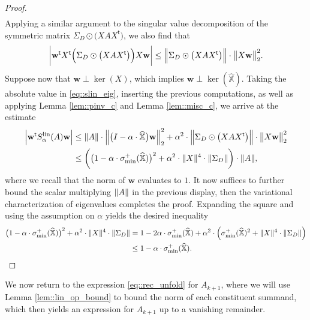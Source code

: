 \documentclass{article}
\newcommand*{\bbX}{\mathbb{X}}
\newcommand*{\bfw}{\mathbf{w}}
\newcommand*{\tran}{^{\mathsf{t}}}
\newcommand*{\sigminp}{\sigma_{\mathrm{min}}^+}
\DeclarePairedDelimiter{\abs}{\lvert}{\rvert}
\DeclarePairedDelimiter{\norm}{\lVert}{\rVert}
\newcommand{\whbbX}{\widehat{\bbX}}
\newcommand{\Slin}{S^{\mathrm{lin}}}
\begin{document}
\begin{proof}
\begin{align*}
  \end{align*} Applying a similar argument to the singular value decomposition
  of the symmetric matrix $\Sigma_D \odot \big(X A X\tran\big)$, we also find
  that \begin{align*}
    \abs[\bigg]{\bfw\tran X\tran \Big(\Sigma_D \odot \big(X A X\tran\big)\Big) X
    \bfw} \leq \norm[\Big]{\Sigma_D \odot \big(X A X\tran\big)} \cdot
    \norm[\big]{X \bfw}_2^2.
  \end{align*} Suppose now that $\bfw \perp \ker(X)$, which implies $\bfw \perp
  \ker(\whbbX)$. Taking the absolute value in \eqref{eq::slin_eig}, inserting
  the previous computations, as well as applying Lemma \ref{lem::pinv_c} and
  Lemma \ref{lem::misc_c}, we arrive at the estimate \begin{align*}
    \abs[\Big]{\bfw\tran \Slin_\alpha(A) \bfw} &\leq \norm{A} \cdot
    \norm[\Big]{\big(I - \alpha \cdot \whbbX\big) \bfw}_2^2 + \alpha^2 \cdot
    \norm[\Big]{\Sigma_D \odot \big(X A X\tran\big)} \cdot \norm[\big]{X
    \bfw}_2^2\\
    &\leq \bigg(\big(1 - \alpha \cdot \sigminp(\whbbX)\big)^2 + \alpha^2 \cdot
    \norm{X}^4 \cdot \norm{\Sigma_D}\bigg) \cdot \norm{A},
  \end{align*} where we recall that the norm of $\bfw$ evaluates to $1$. It now
  suffices to further bound the scalar multiplying $\norm{A}$ in the previous
  display, then the variational characterization of eigenvalues completes the
  proof. Expanding the square and using the assumption on $\alpha$ yields the
  desired inequality \begin{align*}
    \big(1 - \alpha \cdot \sigminp(\whbbX)\big)^2 + \alpha^2 \cdot \norm{X}^4
    \cdot \norm{\Sigma_D} &= 1 - 2 \alpha \cdot \sigminp(\whbbX) + \alpha^2 \cdot
    \Big(\sigminp(\whbbX)^2 + \norm{X}^4 \cdot \norm{\Sigma_D}\Big)\\
    &\leq 1 - \alpha \cdot \sigminp(\whbbX).
  \end{align*}
\end{proof}

We now return to the expression \eqref{eq::rec_unfold} for $A_{k + 1}$, where we
will use Lemma \ref{lem::lin_op_bound} to bound the norm of each constituent
summand, which then yields an expression for $A_{k + 1}$ up to a vanishing
remainder.
\end{document}

